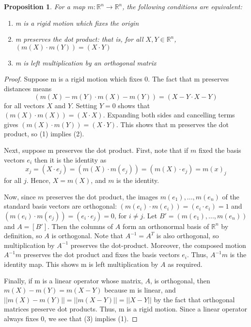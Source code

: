 \documentclass[12pt]{article}
\newtheorem{prop}[thm]{Proposition}
\theoremstyle{definition}
\theoremstyle{remark}
\numberwithin{equation}{section}
\newcommand\R{\mathbb R}    %
\begin{document}
\begin{prop}
        For a map $m:\R^n \rightarrow \R^n$, the following conditions are equivalent: \begin{enumerate}
                \item m is a rigid motion which fixes the origin
                \item m preserves the dot product: that is, for all $X,Y \in \R^n$, $(m(X)\cdot m(Y)) = (X\cdot Y)$
                \item m is left multiplication by an orthogonal matrix
        \end{enumerate}
\end{prop}
\begin{proof}
        Suppose m is a rigid motion which fixes $0$. The fact that m preserves distances means \begin{equation}
                (m(X)-m(Y)\cdot m(X) - m(Y)) = (X - Y \cdot X - Y)
        \end{equation}
        for all vectors $X$ and $Y$. Setting $Y =0$ shows that $(m(X)\cdot m(X)) = (X \cdot X)$. Expanding both sides and cancelling terms gives $(m(X)\cdot m(Y)) = (X\cdot Y)$. This shows that m preserves the dot product, so (1) implies (2).

        Next, suppose m preserves the dot product. First, note that if $m$ fixed the basis vectors $e_i$ then it is the identity as \begin{equation*}
                x_j = (X\cdot e_j) = (m(X) \cdot m(e_j)) = (m(X) \cdot e_j) = m(x)_j
        \end{equation*}
        for all $j$. Hence, $X = m(X)$, and $m$ is the identity. 

        Now, since $m$ preserves the dot product, the images $m(e_1),...,m(e_n)$ of the standard basis vectors are orthogonal: $(m(e_i)\cdot m(e_i)) = (e_i\cdot e_i) = 1$ and $(m(e_i)\cdot m(e_j)) = (e_i \cdot e_j) = 0$, for $i \neq j$. Let $B' = (m(e_1),...,m(e_n))$ and $A = [B']$. Then the columns of $A$ form an orthonormal basis of $\R^n$ by definition, so $A$ is orthogonal. Note that $A^{-1} = A^T$ is also orthogonal, so multiplication by $A^{-1}$ preserves the dot-product. Moreover, the composed motion $A^{-1}m$ preserves the dot product and fixes the basis vectors $e_i$. Thus, $A^{-1}m$ is the identity map. This shows m is left multiplication by $A$ as required.

        Finally, if m is a linear operator whose matrix, $A$, is orthogonal, then $m(X) - m(Y) = m(X-Y)$ because m is linear, and $||m(X) - m(Y)|| = ||m(X-Y)|| = ||X - Y||$ by the fact that orthogonal matrices preserve dot products. Thus, m is a rigid motion. Since a linear operator always fixes $0$, we see that (3) implies (1).
\end{proof}
\end{document}
